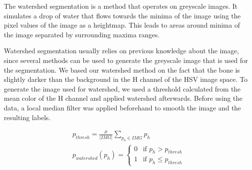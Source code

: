 \documentclass[pdftex,12pt,a4paper]{report}
\begin{document}
The watershed segmentation is a method that operates on greyscale images. It simulates a drop of water that flows towards the minima of the image using the pixel values of the image as a heightmap. This leads to areas around minima of the image separated by surrounding maxima ranges.

Watershed segmentation usually relies on previous knowledge about the image, since several methods can be used to generate the greyscale image that is used for the segmentation. We based our watershed method on the fact that the bone is slightly darker than the background in the H channel of the HSV image space. To generate the image used for watershed, we used a threshold calculated from the mean color of the H channel and applied watershed afterwards. Before using the data, a local median filter was applied beforehand to smooth the image and the resulting labels.

\begin{equation}
\begin{split}
& p_{thresh} = \frac{\mu}{|IMG|} \sum_{p_h \in IMG} p_h \\
& p_{watershed}(p_h) = \begin{cases} 0 & \text{if } p_h > p_{thresh} \\ 1 & \text{if } p_h \leq p_{thresh} \end{cases}
\end{split}
\end{equation}
\end{document}
